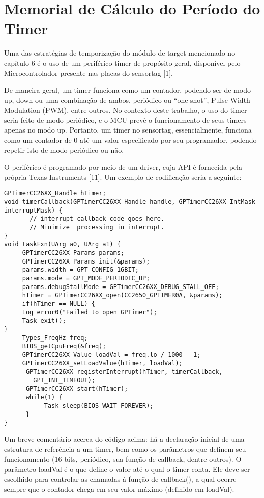 \chapter{Memorial de Cálculo do Período do Timer}

Uma das estratégias de temporização do módulo de target mencionado no capítulo 6 é o uso de um periférico timer de propósito geral, disponível pelo Microcontrolador presente nas placas do sensortag [1].

De maneira geral, um timer funciona como um contador, podendo ser de modo up, down ou uma combinação de ambos, periódico ou “one-shot”, Pulse Width Modulation (PWM), entre outros. No contexto deste trabalho, o uso do timer seria feito de modo periódico, e o MCU prevê o funcionamento de seus timers apenas no modo up. Portanto, um timer no sensortag, essencialmente, funciona como um contador de 0 até um valor especificado por seu programador, podendo repetir isto de modo periódico ou não.

O periférico é programado por meio de um driver, cuja API é fornecida pela própria Texas Instruments [11]. Um exemplo de codificação seria a seguinte:

\begin{lstlisting}
GPTimerCC26XX_Handle hTimer;
void timerCallback(GPTimerCC26XX_Handle handle, GPTimerCC26XX_IntMask interruptMask) {
       // interrupt callback code goes here.
       // Minimize  processing in interrupt.
}
void taskFxn(UArg a0, UArg a1) {
     GPTimerCC26XX_Params params;
     GPTimerCC26XX_Params_init(&params);
     params.width = GPT_CONFIG_16BIT;
     params.mode = GPT_MODE_PERIODIC_UP;
     params.debugStallMode = GPTimerCC26XX_DEBUG_STALL_OFF;
     hTimer = GPTimerCC26XX_open(CC2650_GPTIMER0A, &params);
     if(hTimer == NULL) {
     Log_error0("Failed to open GPTimer");
     Task_exit();
}
     Types_FreqHz freq;
     BIOS_getCpuFreq(&freq);
     GPTimerCC26XX_Value loadVal = freq.lo / 1000 - 1;
     GPTimerCC26XX_setLoadValue(hTimer, loadVal);
      GPTimerCC26XX_registerInterrupt(hTimer, timerCallback,
        GPT_INT_TIMEOUT);
      GPTimerCC26XX_start(hTimer);
      while(1) {
           Task_sleep(BIOS_WAIT_FOREVER);
      }
}
\end{lstlisting}

Um breve comentário acerca do código acima: há a declaração inicial de uma estrutura de referência a um timer, bem como os parâmetros que definem seu funcionamento (16 bits, periódico, sua função de callback, dentre outros). O parâmetro loadVal é o que define o valor até o qual o timer conta. Ele deve ser escolhido para controlar as chamadas à função de callback(), a qual ocorre sempre que o contador chega em seu valor máximo (definido em loadVal).

